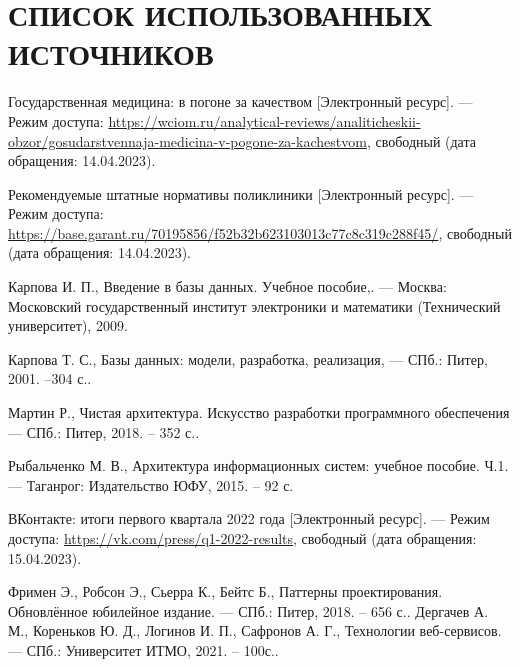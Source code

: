 \section*{СПИСОК ИСПОЛЬЗОВАННЫХ ИСТОЧНИКОВ}

\begingroup
\renewcommand{\section}[2]{}

\begin{thebibliography}{}
	Государственная медицина: в погоне за качеством [Электронный ресурс]. --- Режим доступа: \url{https://wciom.ru/analytical-reviews/analiticheskii-obzor/gosudarstvennaja-medicina-v-pogone-za-kachestvom}, свободный (дата обращения: 14.04.2023).
	
	Рекомендуемые штатные нормативы поликлиники [Электронный ресурс]. --- Режим доступа: \url{https://base.garant.ru/70195856/f52b32b623103013c77c8c319c288f45/}, свободный (дата обращения: 14.04.2023).
	
	Карпова И. П., Введение в базы данных. Учебное пособие,. --- Москва: Московский государственный институт электроники и математики (Технический университет), 2009.
	
	Карпова Т. С., Базы данных: модели, разработка, реализация, --- СПб.: Питер, 2001. --304 с..
	
	Мартин Р., Чистая архитектура. Искусство разработки программного обеспечения --- СПб.: Питер, 2018. -- 352 с..
	
	Рыбальченко М. В., Архитектура информационных систем: учебное пособие. Ч.1. --- Таганрог: Издательство ЮФУ, 2015. -- 92 с.
	
	ВКонтакте: итоги первого квартала 2022 года [Электронный ресурс]. --- Режим доступа: \url{https://vk.com/press/q1-2022-results}, свободный (дата обращения: 15.04.2023).
	
	Фримен Э., Робсон Э., Сьерра К., Бейтс Б., Паттерны проектирования. Обновлённое юбилейное издание. --- СПб.: Питер, 2018. -- 656 с..
	Дергачев А. М., Кореньков Ю. Д., Логинов И. П., Сафронов А. Г., Технологии веб-сервисов. --- СПб.: Университет ИТМО, 2021. -- 100с..
	

\end{thebibliography}
